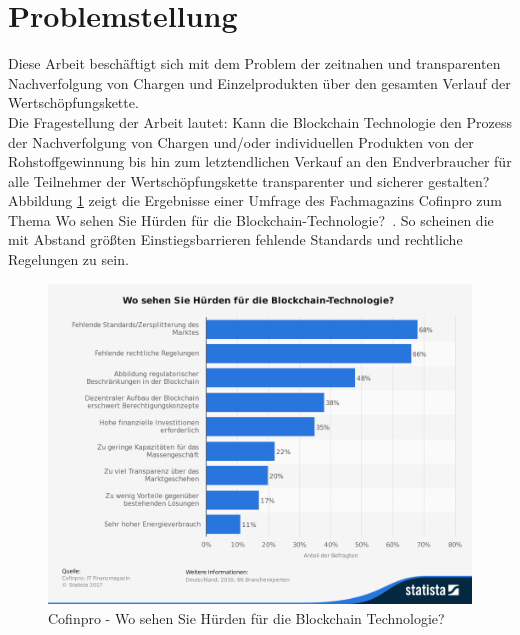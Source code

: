 \section{Problemstellung}

Diese Arbeit beschäftigt sich mit dem Problem der zeitnahen und transparenten Nachverfolgung von Chargen und Einzelprodukten über den gesamten Verlauf der Wertschöpfungskette.\\

Die Fragestellung der Arbeit lautet: Kann die Blockchain Technologie den Prozess der Nachverfolgung von Chargen und/oder individuellen Produkten von der Rohstoffgewinnung bis hin zum letztendlichen Verkauf an den Endverbraucher für alle Teilnehmer der Wertschöpfungskette transparenter und sicherer gestalten?\\

Abbildung \ref{fig:statista-huerden-blockchain-2016} zeigt die Ergebnisse einer Umfrage des Fachmagazins Cofinpro zum Thema \glqq Wo sehen Sie Hürden für die Blockchain-Technologie?\grqq~. So scheinen die mit Abstand größten Einstiegsbarrieren fehlende Standards und rechtliche Regelungen zu sein.\\

\begin{figure}[h!]
	\centering
	\includegraphics[width=0.7\linewidth]{pictures/Statista-Huerden-Blockchain-2016}
	\caption[Statista Blockchain Umfrage]{Cofinpro - Wo sehen Sie Hürden für die Blockchain Technologie? \cite{Cofinpro}}
	\label{fig:statista-huerden-blockchain-2016}
\end{figure}


